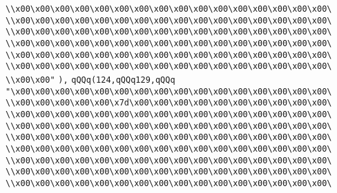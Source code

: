 \verb|\\x00\x00\x00\x00\x00\x00\x00\x00\x00\x00\x00\x00\x00\x00\x00\x00\|\newline
\verb|\\x00\x00\x00\x00\x00\x00\x00\x00\x00\x00\x00\x00\x00\x00\x00\x00\|\newline
\verb|\\x00\x00\x00\x00\x00\x00\x00\x00\x00\x00\x00\x00\x00\x00\x00\x00\|\newline
\verb|\\x00\x00\x00\x00\x00\x00\x00\x00\x00\x00\x00\x00\x00\x00\x00\x00\|\newline
\verb|\\x00\x00\x00\x00\x00\x00\x00\x00\x00\x00\x00\x00\x00\x00\x00\x00\|\newline
\verb|\\x00\x00\x00\x00\x00\x00\x00\x00\x00\x00\x00\x00\x00\x00\x00\x00\|\newline
\verb|\\x00\x00"|\newline
\verb|),|\newline
\verb|qQQq(124,qQQq129,qQQq|\newline
\verb|"\x00\x00\x00\x00\x00\x00\x00\x00\x00\x00\x00\x00\x00\x00\x00\x00\|\newline
\verb|\\x00\x00\x00\x00\x00\x7d\x00\x00\x00\x00\x00\x00\x00\x00\x00\x00\|\newline
\verb|\\x00\x00\x00\x00\x00\x00\x00\x00\x00\x00\x00\x00\x00\x00\x00\x00\|\newline
\verb|\\x00\x00\x00\x00\x00\x00\x00\x00\x00\x00\x00\x00\x00\x00\x00\x00\|\newline
\verb|\\x00\x00\x00\x00\x00\x00\x00\x00\x00\x00\x00\x00\x00\x00\x00\x00\|\newline
\verb|\\x00\x00\x00\x00\x00\x00\x00\x00\x00\x00\x00\x00\x00\x00\x00\x00\|\newline
\verb|\\x00\x00\x00\x00\x00\x00\x00\x00\x00\x00\x00\x00\x00\x00\x00\x00\|\newline
\verb|\\x00\x00\x00\x00\x00\x00\x00\x00\x00\x00\x00\x00\x00\x00\x00\x00\|\newline
\verb|\\x00\x00\x00\x00\x00\x00\x00\x00\x00\x00\x00\x00\x00\x00\x00\x00\|\newline
